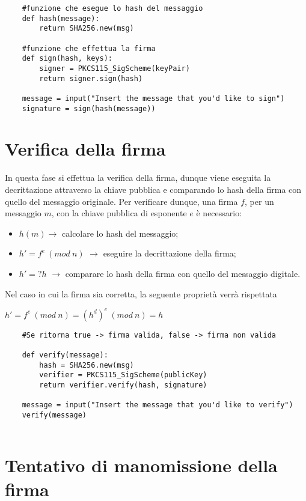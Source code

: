 \begin{lstlisting}
	#funzione che esegue lo hash del messaggio
	def hash(message):
		return SHA256.new(msg)
	
	#funzione che effettua la firma
	def sign(hash, keys):
		signer = PKCS115_SigScheme(keyPair)
		return signer.sign(hash)
	
	message = input("Insert the message that you'd like to sign")
	signature = sign(hash(message))
\end{lstlisting}

\newpage

\section{Verifica della firma}

In questa fase si effettua la verifica della firma, dunque viene eseguita la decrittazione attraverso la chiave pubblica e comparando lo hash della firma con quello del messaggio originale.
Per verificare dunque, una firma $f$, per un messaggio $m$, con la chiave pubblica di esponente $e$ è necessario:
\begin{itemize}
	\item $h(m) \rightarrow$ calcolare lo hash del messaggio;
	\item $h' = f^e \: (mod \: n)$ $\rightarrow$ eseguire la decrittazione della firma;
	\item $h' =? h$ $\rightarrow$ comparare lo hash della firma con quello del messaggio digitale.
\end{itemize}

Nel caso in cui la firma sia corretta, la seguente proprietà verrà rispettata

\begin{center}
	$h'=f^{e} \: (mod \: n) = (h^d)^e \: (mod \: n) = h$
\end{center} 

\begin{lstlisting}
	#Se ritorna true -> firma valida, false -> firma non valida
	
	def verify(message):
		hash = SHA256.new(msg)
		verifier = PKCS115_SigScheme(publicKey)
		return verifier.verify(hash, signature)
	
	message = input("Insert the message that you'd like to verify")
	verify(message)
	
\end{lstlisting}



\section{Tentativo di manomissione della firma}

